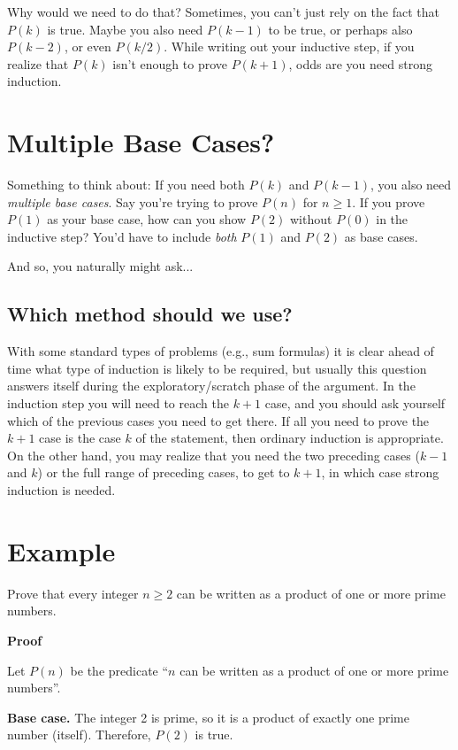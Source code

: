 \documentclass[12pt,letterpaper]{article}
\begin{document}
Why would we need to do that? Sometimes, you can't just rely on the fact that $P(k)$ is true. Maybe you also need $P(k-1)$ to be true, or perhaps also $P(k-2)$, or even $P(k/2)$. While writing out your inductive step, if you realize that $P(k)$ isn't enough to prove $P(k+1)$, odds are you need strong induction.

\section*{Multiple Base Cases?}

Something to think about: If you need both $P(k)$ and $P(k-1)$, you also need \textit{multiple base cases}. Say you're trying to prove $P(n)$ for $n \geq 1$. If you prove $P(1)$ as your base case, how can you show $P(2)$ without $P(0)$ in the inductive step? You'd have to include \textit{both} $P(1)$ and $P(2)$ as base cases.

And so, you naturally might ask...

\subsection*{Which method should we use?}

With some standard types of problems (e.g., sum formulas) it is clear ahead of time what type of induction is likely to be required, but usually this question answers itself during the exploratory/scratch phase of the argument. In the induction step you will need to reach the $k + 1$ case, and you should ask yourself which of the previous cases you need to get there. If all you need to prove the $k + 1$ case is the case $k$ of the statement, then ordinary induction is appropriate. On the other hand, you may realize that you need the two preceding cases ($k − 1$ and $k$) or the full range of preceding cases, to get to $k + 1$, in which case strong induction is needed.

\section*{Example}

Prove that every integer $n \geq 2$ can be written as a product of one or more prime numbers.

\textbf{Proof}

Let $P(n)$ be the predicate “$n$ can be written as a product of one or more prime numbers”.

\textbf{Base case.} The integer 2 is prime, so it is a product of exactly one prime number (itself). Therefore, $P(2)$ is true.
\end{document}
